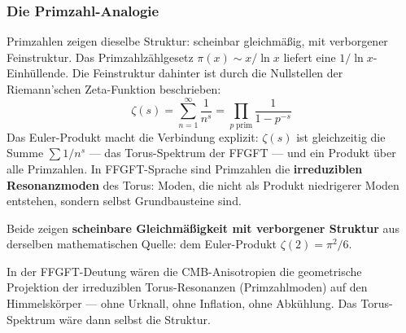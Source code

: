 \subsubsection*{Die Primzahl-Analogie}

Primzahlen zeigen dieselbe Struktur: scheinbar gleichmäßig, mit verborgener
Feinstruktur. Das Primzahlzählgesetz $\pi(x) \sim x/\ln x$ liefert eine
$1/\ln x$-Einhüllende. Die Feinstruktur dahinter ist durch die Nullstellen
der Riemann'schen Zeta-Funktion beschrieben:
\begin{equation}
    \zeta(s) = \sum_{n=1}^{\infty} \frac{1}{n^s}
    = \prod_{p\;\text{prim}} \frac{1}{1-p^{-s}}
\end{equation}
Das Euler-Produkt macht die Verbindung explizit: $\zeta(s)$ ist gleichzeitig
die Summe $\sum 1/n^s$ — das Torus-Spektrum der FFGFT — und ein Produkt
über alle Primzahlen. In FFGFT-Sprache sind Primzahlen die
\textbf{irreduziblen Resonanzmoden} des Torus: Moden, die nicht als
Produkt niedrigerer Moden entstehen, sondern selbst Grundbausteine sind.

\begin{interpretation}
Beide zeigen \textbf{scheinbare Gleichmäßigkeit mit verborgener Struktur}
aus derselben mathematischen Quelle: dem Euler-Produkt $\zeta(2) = \pi^2/6$.

In der FFGFT-Deutung wären die CMB-Anisotropien die geometrische Projektion der
irreduziblen Torus-Resonanzen (Primzahlmoden) auf den Himmelskörper —
ohne Urknall, ohne Inflation, ohne Abkühlung. Das Torus-Spektrum
wäre dann selbst die Struktur.
\end{interpretation}

\begin{table}[ht]
\centering
{}
\caption{Primzahlen und CMB-Anisotropien als mögliche Instanzen desselben ewigen Spektrums [S]}
\end{table}

